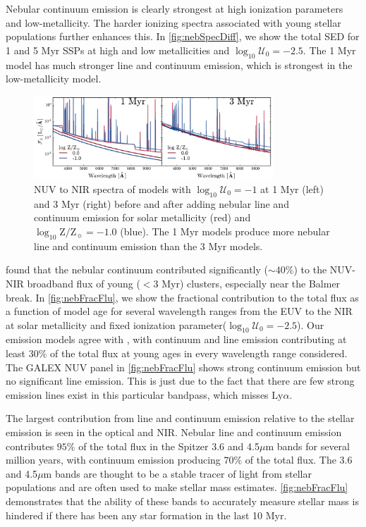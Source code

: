 \documentclass[twocolumn, tighten]{aastex61}
\newcommand{\Fig}[1]{\autoref{fig:#1}}
\newcommand{\logten}{\ensuremath{\log_{10}}}
\newcommand{\Lya}{\ensuremath{\mathrm{Ly}\alpha}}
\newcommand{\logZeq}[1]{\ensuremath{\logten \mathrm{Z}/\mathrm{Z}_{\sun} = #1}}
\newcommand{\logU}{\ensuremath{\logten \mathcal{U}_0}}
\begin{document}
Nebular continuum emission is clearly strongest at high ionization parameters and low-metallicity. The harder ionizing spectra associated with young stellar populations further enhances this. In \Fig{nebSpecDiff}, we show the total SED for 1 and 5 Myr SSPs at high and low metallicities and $\logU =-2.5$. The 1 Myr model has much stronger line and continuum emission, which is strongest in the low-metallicity model.

\begin{figure}
  \begin{centering}
    \includegraphics[width=0.8\textwidth]{f11.pdf}
    \caption{NUV to NIR spectra of models with $\logU=-1$ at 1 Myr (left) and 3 Myr (right) before and after adding nebular line and continuum emission for solar metallicity (red) and \logZeq{-1.0} (blue). The 1 Myr models produce more nebular line and continuum emission than the 3 Myr models.}
    \label{fig:nebSpecDiff}
  \end{centering}
\end{figure}

\citet{Reines10} found that the nebular continuum contributed significantly ($\sim40$\%) to the NUV-NIR broadband flux of young ($<3$ Myr) clusters, especially near the Balmer break. In \Fig{nebFracFlu}, we show the fractional contribution to the total flux as a function of model age for several wavelength ranges from the EUV to the NIR at solar metallicity and fixed ionization parameter($\logU=-2.5$). Our emission models agree with \citet{Reines10}, with continuum and line emission contributing at least 30\% of the total flux at young ages in every wavelength range considered. The GALEX NUV panel in \Fig{nebFracFlu} shows strong continuum emission but no significant line emission. This is just due to the fact that there are few strong emission lines exist in this particular bandpass, which misses \Lya.

The largest contribution from line and continuum emission relative to the stellar emission is seen in the optical and NIR. Nebular line and continuum emission contributes $95\%$ of the total flux in the Spitzer 3.6 and 4.5$\mu$m bands for several million years, with continuum emission producing $70\%$ of the total flux. The 3.6 and 4.5$\mu$m bands are thought to be a stable tracer of light from stellar populations and are often used to make stellar mass estimates. \Fig{nebFracFlu} demonstrates that the ability of these bands to accurately measure stellar mass is hindered if there has been any star formation in the last 10 Myr.
\end{document}
